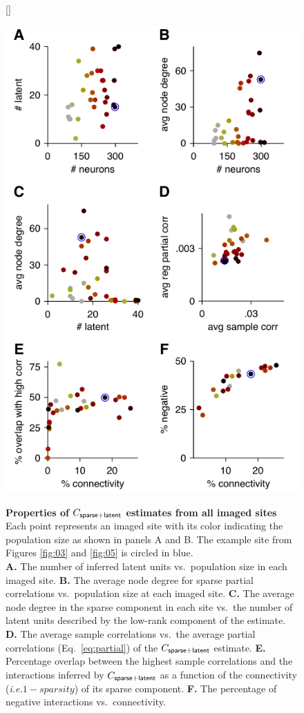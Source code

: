 \documentclass[10pt]{article}
\newcommand{\ie}{\emph{i.e.}\;}
\begin{document}
\begin{figure}    [\FBwidth]
    {\caption{{\bf Properties of $C_{\sf sparse+latent}$ estimates from all imaged sites} Each point represents an imaged site with its color indicating the population size as shown in panels A and B. The example site from Figures \ref{fig:03} and \ref{fig:05} is circled in blue. 
\\
    {\bf A.} The number of inferred latent units vs.~population size in each imaged site.
    {\bf B.} The average node degree for sparse partial correlations vs.~population size at each imaged site.
    {\bf C.} The average node degree in the sparse component in each site vs.~the number of latent units described by the low-rank component of the estimate.
    {\bf D.} The average sample correlations  vs.~the average partial correlations (Eq.~\ref{eq:partial}) of the $C_{\sf sparse+latent}$ estimate.
    {\bf E.} Percentage overlap between the highest sample correlations and the  interactions inferred by $C_{\sf sparse+latent}$ as a function of the connectivity (\ie $1-sparsity$) of its sparse component. 
    {\bf F.} The percentage of negative interactions vs.~connectivity.
}
\label{fig:06}}
{\includegraphics{./figures/Figure06.pdf}}
\end{figure}
\end{document}

